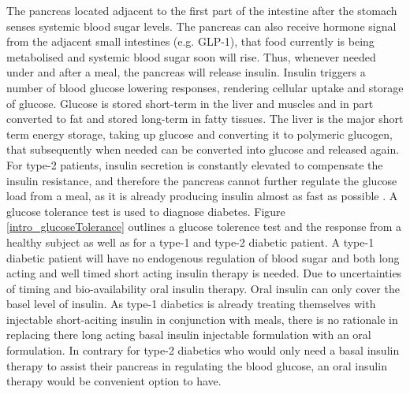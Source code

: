 The pancreas located adjacent to the first part of the intestine after the stomach senses systemic blood sugar levels. The pancreas can also receive hormone signal from the adjacent small intestines (e.g. GLP-1), that food currently is being metabolised and systemic blood sugar soon will rise. Thus, whenever needed under and after a meal, the pancreas will release insulin. Insulin triggers a number of blood glucose lowering responses, rendering cellular uptake and storage of glucose. Glucose is stored short-term in the liver and muscles and in part converted to fat and stored long-term in fatty tissues. The liver is the major short term energy storage, taking up glucose and converting it to polymeric glucogen, that subsequently when needed can be converted into glucose and released again. For type-2 patients, insulin secretion is constantly elevated to compensate the insulin resistance, and therefore the pancreas cannot further regulate the glucose load from a meal, as it is already producing insulin almost as fast as possible \cite{silverthorn2010human}. A glucose tolerance test is used to diagnose diabetes. Figure \cref{intro_glucoseTolerance} outlines a glucose tolerence test and the response from a healthy subject as well as for a type-1 and type-2 diabetic patient. A type-1 diabetic patient will have no endogenous regulation of blood sugar and both long acting and well timed short acting insulin therapy is needed. Due to uncertainties of timing and bio-availability oral insulin therapy. Oral insulin can only cover the basel level of insulin. As type-1 diabetics is already treating themselves with injectable short-aciting insulin in conjunction with meals, there is no rationale in replacing there long acting basal insulin injectable formulation with an oral formulation. In contrary for type-2 diabetics who would only need a basal insulin therapy to assist their pancreas in regulating the blood glucose, an oral insulin therapy would be convenient option to have.


